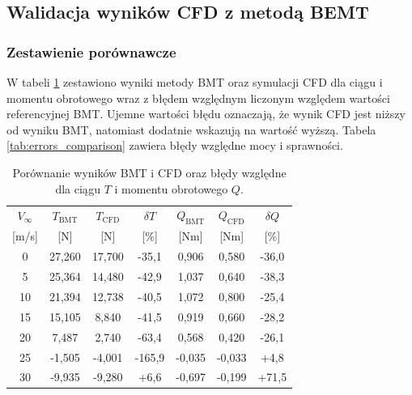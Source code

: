 \documentclass[12pt,a4paper,twoside]{article}
\begin{document}
	\subsection{Walidacja wyników CFD z metodą BEMT}
	
	\subsubsection{Zestawienie porównawcze}
	W tabeli \ref{tab:comparison} zestawiono wyniki metody BMT oraz symulacji CFD dla ciągu i momentu obrotowego wraz z błędem względnym liczonym względem wartości referencyjnej BMT. Ujemne wartości błędu oznaczają, że wynik CFD jest niższy od wyniku BMT, natomiast dodatnie wskazują na wartość wyższą. Tabela \ref{tab:errors_comparison} zawiera błędy względne mocy i sprawności.
	
	\begin{table}[H]
		\centering
		\small
		\caption{Porównanie wyników BMT i CFD oraz błędy względne dla ciągu \(T\) i momentu obrotowego \(Q\).}
		\label{tab:comparison}
		\begin{tabular}{@{}c c c c c c c@{}}
			\toprule
			\(V_\infty\) & \(T_{\text{BMT}}\) & \(T_{\text{CFD}}\) & \(\delta T\) & \(Q_{\text{BMT}}\) & \(Q_{\text{CFD}}\) & \(\delta Q\) \\
 			{[m/s]} & {[N]} & {[N]} & {[\%]} & {[Nm]} & {[Nm]} & {[\%]} \\
			\midrule
			0  & 27,260  & 17,700  & -35,1  & 0,906  & 0,580  & -36,0  \\
			5  & 25,364  & 14,480  & -42,9  & 1,037  & 0,640  & -38,3 \\
			10 & 21,394  & 12,738  & -40,5  & 1,072  & 0,800  & -25,4 \\
			15 & 15,105  & 8,840   & -41,5  & 0,919  & 0,660  & -28,2 \\
			20 & 7,487   & 2,740   & -63,4  & 0,568  & 0,420  & -26,1 \\
			25 & -1,505  & -4,001  & -165,9 & -0,035 & -0,033 & +4,8  \\
			30 & -9,935  & -9,280  & +6,6   & -0,697 & -0,199 & +71,5 \\
			\bottomrule
		\end{tabular}
	\end{table}
	
\end{document}
